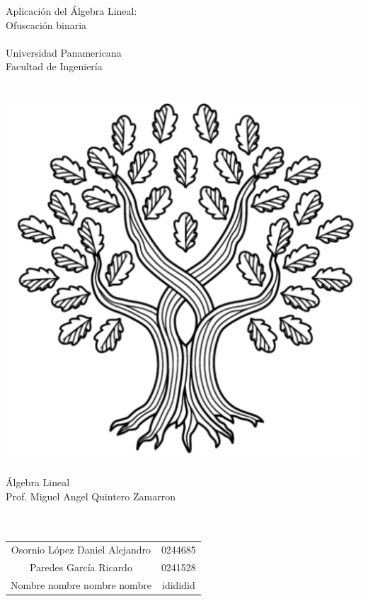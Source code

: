 \documentclass[a4paper]{article}
\begin{document}
\hspace{0pt}
\vfill

\begin{center}
    {\huge Aplicación del Álgebra Lineal:\\Ofuscación binaria}\\    \quad\\
    {\large Universidad Panamericana}\\
    {\large Facultad de Ingeniería}\\
    \quad\\
    \quad\\
    \includegraphics[scale=0.3]{UP.png}
    \quad\\
    \quad\\
    Álgebra Lineal\\
    Prof. Miguel Angel Quintero Zamarron\\
    \quad\\
    \quad\\
    \begin{tabular}{c|c}
        Osornio López Daniel Alejandro & 0244685\\
        Paredes García Ricardo & 0241528\\
        Nombre nombre nombre nombre & idididid\\
    \end{tabular}\\
    \quad\\
    \quad\\
\end{center}
\end{document}

